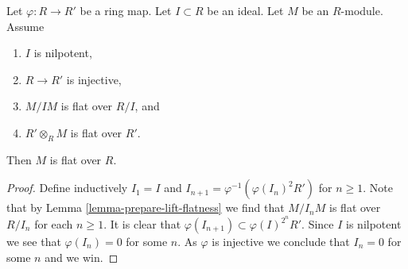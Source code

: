 \begin{lemma}
\label{lemma-lift-flatness}
Let $\varphi : R \to R'$ be a ring map.
Let $I \subset R$ be an ideal.
Let $M$ be an $R$-module.
Assume
\begin{enumerate}
\item $I$ is nilpotent,
\item $R \to R'$ is injective,
\item $M/IM$ is flat over $R/I$, and
\item $R' \otimes_R M$ is flat over $R'$.
\end{enumerate}
Then $M$ is flat over $R$.
\end{lemma}

\begin{proof}
Define inductively $I_1 = I$ and $I_{n + 1} = \varphi^{-1}(\varphi(I_n)^2R')$
for $n \geq 1$. Note that by
Lemma \ref{lemma-prepare-lift-flatness}
we find that $M/I_nM$ is flat over $R/I_n$ for each $n \geq 1$.
It is clear that $\varphi(I_{n + 1}) \subset \varphi(I)^{2^n}R'$. Since
$I$ is nilpotent we see that $\varphi(I_n) = 0$ for some $n$. As
$\varphi$ is injective we conclude that $I_n = 0$ for some $n$ and
we win.
\end{proof}

